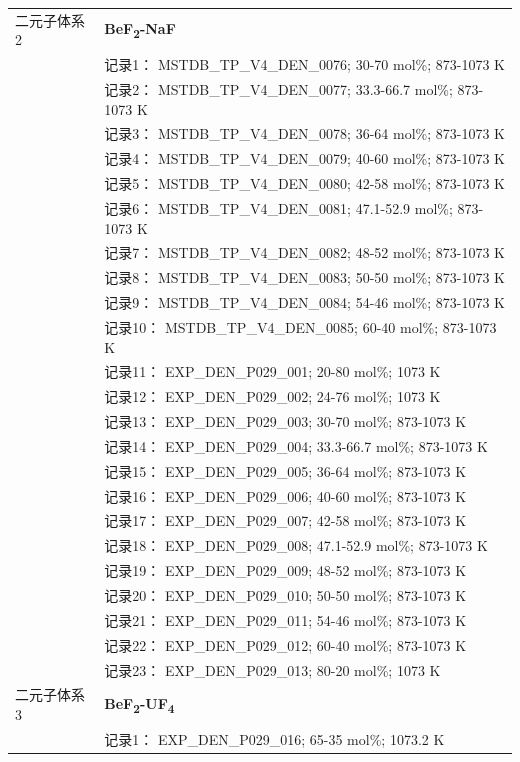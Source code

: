 \documentclass[12pt]{article}
\begin{document}
{\begin{longtable}[]{@{}
  >{\raggedright\arraybackslash}p{}
  >{\raggedright\arraybackslash}p{}@{}}
二元子体系 2  & \textbf{BeF\textsubscript{2}-NaF} \\
 & 记录1： MSTDB\_TP\_V4\_DEN\_0076; 30-70 mol\%; 873-1073 K \\
 & 记录2： MSTDB\_TP\_V4\_DEN\_0077; 33.3-66.7 mol\%; 873-1073 K \\
 & 记录3： MSTDB\_TP\_V4\_DEN\_0078; 36-64 mol\%; 873-1073 K \\
 & 记录4： MSTDB\_TP\_V4\_DEN\_0079; 40-60 mol\%; 873-1073 K \\
 & 记录5： MSTDB\_TP\_V4\_DEN\_0080; 42-58 mol\%; 873-1073 K \\
 & 记录6： MSTDB\_TP\_V4\_DEN\_0081; 47.1-52.9 mol\%; 873-1073 K \\
 & 记录7： MSTDB\_TP\_V4\_DEN\_0082; 48-52 mol\%; 873-1073 K \\
 & 记录8： MSTDB\_TP\_V4\_DEN\_0083; 50-50 mol\%; 873-1073 K \\
 & 记录9： MSTDB\_TP\_V4\_DEN\_0084; 54-46 mol\%; 873-1073 K \\
 & 记录10： MSTDB\_TP\_V4\_DEN\_0085; 60-40 mol\%; 873-1073 K \\
 & 记录11： EXP\_DEN\_P029\_001; 20-80 mol\%; 1073 K \\
 & 记录12： EXP\_DEN\_P029\_002; 24-76 mol\%; 1073 K \\
 & 记录13： EXP\_DEN\_P029\_003; 30-70 mol\%; 873-1073 K \\
 & 记录14： EXP\_DEN\_P029\_004; 33.3-66.7 mol\%; 873-1073 K \\
 & 记录15： EXP\_DEN\_P029\_005; 36-64 mol\%; 873-1073 K \\
 & 记录16： EXP\_DEN\_P029\_006; 40-60 mol\%; 873-1073 K \\
 & 记录17： EXP\_DEN\_P029\_007; 42-58 mol\%; 873-1073 K \\
 & 记录18： EXP\_DEN\_P029\_008; 47.1-52.9 mol\%; 873-1073 K \\
 & 记录19： EXP\_DEN\_P029\_009; 48-52 mol\%; 873-1073 K \\
 & 记录20： EXP\_DEN\_P029\_010; 50-50 mol\%; 873-1073 K \\
 & 记录21： EXP\_DEN\_P029\_011; 54-46 mol\%; 873-1073 K \\
 & 记录22： EXP\_DEN\_P029\_012; 60-40 mol\%; 873-1073 K \\
 & 记录23： EXP\_DEN\_P029\_013; 80-20 mol\%; 1073 K  \\

二元子体系 3  & \textbf{BeF\textsubscript{2}-UF\textsubscript{4}} \\
 & 记录1： EXP\_DEN\_P029\_016; 65-35 mol\%; 1073.2 K  \\


\end{longtable}}
\end{document}
